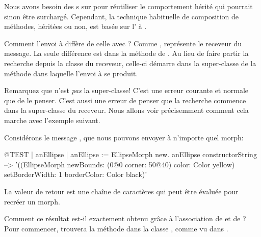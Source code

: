 \documentclass[a4paper,10pt,twoside]{book}
\begin{document}
Nous avons besoin des s sur \super pour 
réutiliser le comportement hérité qui pourrait sinon être
surchargé.
Cependant, la technique habituelle de composition de méthodes,
héritées ou non, est basée sur l' à
\self.

Comment l'envoi à \self diffère de celle avec \super?
Comme \self, \super représente le receveur du message.
La seule différence est dans la méthode de .
Au lieu de faire partir la recherche depuis la classe du receveur,
celle-ci démarre dans la super-classe de la méthode dans laquelle
l'envoi à \super se produit. 

Remarquez que \super n'est \emph{pas} la super-classe!
C'est une erreur courante et normale que de le penser.
C'est aussi une erreur de penser que la recherche commence dans la super-classe du receveur.
Nous allons voir précisemment comment cela marche avec l'exemple suivant.

Considérons le message , que nous pouvons envoyer à 
n'importe quel morph:
\begin{code}{@TEST | anEllipse | anEllipse := EllipseMorph new.}
anEllipse constructorString --> '((EllipseMorph newBounds: (0@0 corner: 50@40) color: Color yellow) setBorderWidth: 1 borderColor: Color black)'
\end{code}
La valeur de retour est une chaîne de caractères qui peut être évaluée pour recréer un morph.

Comment ce résultat est-il exactement obtenu grâce à l'association de \self et de \super?
Pour commencer, 
 trouvera la méthode  dans la 
classe ,
comme vu dans .
\end{document}
